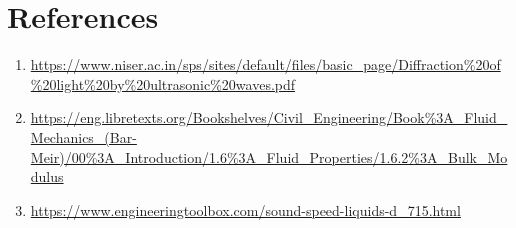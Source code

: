 \documentclass[a4paper, amsfonts, amssymb, amsmath, reprint, showkeys, nofootinbib, twoside]{revtex4-1}
\begin{document}
\section{References}
\begin{enumerate}
\item{\url{https://www.niser.ac.in/sps/sites/default/files/basic_page/Diffraction%20of%20light%20by%20ultrasonic%20waves.pdf}}
\item {\url{https://eng.libretexts.org/Bookshelves/Civil_Engineering/Book%3A_Fluid_Mechanics_(Bar-Meir)/00%3A_Introduction/1.6%3A_Fluid_Properties/1.6.2%3A_Bulk_Modulus}}
\item {\url{https://www.engineeringtoolbox.com/sound-speed-liquids-d_715.html}}
\end{enumerate}
\end{document}

